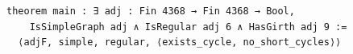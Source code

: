 \begin{Verbatim}[fontsize=\footnotesize,frame=single]
theorem main : ∃ adj : Fin 4368 → Fin 4368 → Bool,
    IsSimpleGraph adj ∧ IsRegular adj 6 ∧ HasGirth adj 9 :=
  ⟨adjF, simple, regular, ⟨exists_cycle, no_short_cycles⟩⟩
\end{Verbatim}
